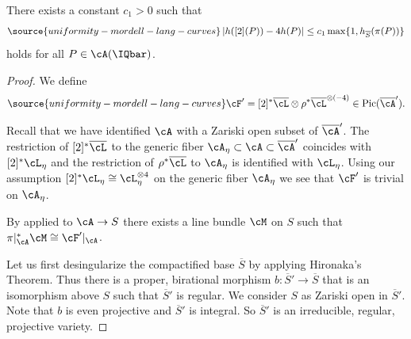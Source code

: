 \begin{proposition}
\notready
\label{prop:canonical-height-duplication}
  There exists a constant $c_1>0$ such that
  \begin{equation}
    \label{eq:duplicationbound}
\source{uniformity-mordell-lang-curves}
\left|   \hcA([2](P)) - 4
   \hcA(P)\right|  \le c_1  \max\{1,h_{\overline
   S}(\pi(P))\}
  \end{equation}
  holds for all $P\in \cA(\IQbar)$.
\end{proposition}
\begin{proof}
  We define
  \begin{equation}
  \label{def:cF2}
\source{uniformity-mordell-lang-curves}
  \cF' =  [2]^* \overline{\cL} \otimes
  \rho^*\overline{\cL}^{\otimes(-4)} \in \mathrm{Pic}(\overline{\cA}').
\end{equation}

Recall that we have identified $\cA$ with a Zariski open subset of
$\overline{\cA}'$.
The  restriction of $[2]^*\overline{\cL}$ to the generic fiber
$\cA_\eta\subset\cA\subset\overline{\cA}'$
coincides with $[2]^*\cL_\eta$ and the restriction of $\rho^*\overline{\cL}$  to $\cA_\eta$
is identified with $\cL_\eta$. Using our assumption
 $[2]^*\cL_\eta \cong
\cL_\eta^{\otimes 4}$ on the generic fiber $\cA_\eta$ we see that  $\cF'$ is trivial on $\cA_\eta$.

By \cite[Corollaire~21.4.13 (pp.~361 of EGA IV-4, in Errata et Addenda, liste~3)]{EGAIV} %
applied to
$\cA\rightarrow S$ there exists a line
bundle $\cM$ on $S$ such that $\pi|_{\cA}^*\cM \cong \cF'|_{\cA}$.

Let us first desingularize the compactified base $\overline S$ by applying
Hironaka's Theorem. Thus there is a proper, birational morphism
$b\colon \overline S'\rightarrow\overline S$ that is an isomorphism
above $S$
 such that  $\overline S'$
is regular. We consider $S$ as Zariski open in $\overline S'$.  Note that $b$ is even
projective and $\overline S'$ is integral. So $\overline S'$ is an
irreducible, regular, projective variety.


\end{proof}
